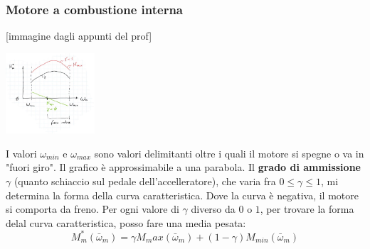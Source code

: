 \subsubsection{Motore a combustione interna}
[immagine dagli appunti del prof]
\begin{center}
    \includegraphics[height=3cm]{../lezione12/img3.JPG}
\end{center}
I valori $\omega_{min}$ e $\omega_{max}$ sono valori delimitanti oltre i quali il motore si spegne o va in "fuori giro".\newline
\newline
Il grafico è approssimabile a una parabola.\newline
\newline
Il \textbf{grado di ammissione} $\gamma$ (quanto schiaccio sul pedale dell'accelleratore), che varia fra $0 \leq \gamma \leq 1$, mi determina la forma della curva caratteristica.\newline
\newline
Dove la curva è negativa, il motore si comporta da freno.\newline
\newline
Per ogni valore di $\gamma$ diverso da $0$ o $1$, per trovare la forma delal curva caratteristica, posso fare una media pesata:
\[
    M_m^* (\bar{\omega}_m) = \gamma M_max(\bar{\omega}_m) + (1- \gamma) M_{min} (\bar{\omega}_m)
\]
